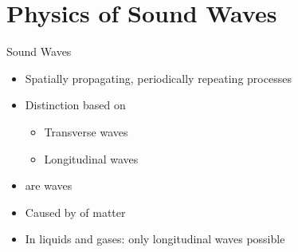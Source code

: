 

\section{Physics of Sound Waves}


\begin{frame}[c]{Sound Waves}

    \begin{itemize}
        \setlength\itemsep{0.3cm}
        \item Spatially propagating, periodically repeating processes
        \item Distinction based on 
              \begin{itemize}
                  \item Transverse waves
                  \item Longitudinal waves
              \end{itemize}
    \end{itemize}
    \vspace{1cm}


    \begin{itemize}
        \item {} are  waves
        \item Caused by  of matter
        \item In liquids and gases: only longitudinal waves possible
    \end{itemize}

\end{frame}


